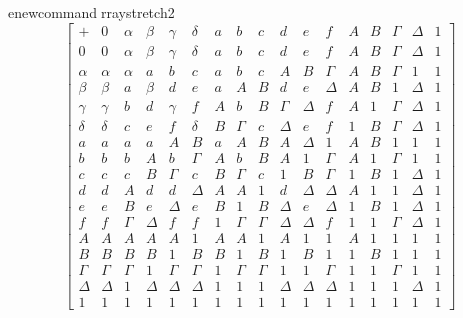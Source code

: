 enewcommand{rraystretch}{2}
  \[\begin{bmatrix}
   + & 0 & \alpha & \beta & \gamma & \delta & a & b & c & d & e & f & A & B & \Gamma & \Delta & 1 \\
  0 & 0 & \alpha & \beta & \gamma & \delta & a & b & c & d & e & f & A & B & \Gamma & \Delta & 1 \\
  \alpha & \alpha & \alpha & a & b & c & a & b & c & A & B & \Gamma & A & B & \Gamma & 1 & 1 \\
  \beta & \beta & a & \beta & d & e & a & A & B & d & e & \Delta & A & B & 1 & \Delta & 1 \\
  \gamma & \gamma & b & d & \gamma & f & A & b & B & \Gamma & \Delta & f & A & 1 & \Gamma & \Delta & 1 \\
  \delta & \delta & c & e & f & \delta & B & \Gamma & c & \Delta & e & f & 1 & B & \Gamma & \Delta & 1 \\
  a & a & a & a & A & B & a & A & B & A & \Delta & 1 & A & B & 1 & 1 & 1 \\
  b & b & b & A & b & \Gamma & A & b & B & A & 1 & \Gamma & A & 1 & \Gamma & 1 & 1 \\
  c & c & c & B & \Gamma & c & B & \Gamma & c & 1 & B & \Gamma & 1 & B & 1 & \Delta & 1 \\
  d & d & A & d & d & \Delta & A & A & 1 & d & \Delta & \Delta & A & 1 & 1 & \Delta & 1 \\
  e & e & B & e & \Delta & e & B & 1 & B & \Delta & e & \Delta & 1 & B & 1 & \Delta & 1 \\
  f & f & \Gamma & \Delta & f & f & 1 & \Gamma & \Gamma & \Delta & \Delta & f & 1 & 1 & \Gamma & \Delta & 1 \\
  A & A & A & A & A & 1 & A & A & 1 & A & 1 & 1 & A & 1 & 1 & 1 & 1 \\
  B & B & B & B & 1 & B & B & 1 & B & 1 & B & 1 & 1 & B & 1 & 1 & 1 \\
  \Gamma & \Gamma & \Gamma & 1 & \Gamma & \Gamma & 1 & \Gamma & \Gamma & 1 & 1 & \Gamma & 1 & 1 & \Gamma & 1 & 1 \\
  \Delta & \Delta & 1 & \Delta & \Delta & \Delta & 1 & 1 & 1 & \Delta & \Delta & \Delta & 1 & 1 & 1 & \Delta & 1 \\
  1 & 1 & 1 & 1 & 1 & 1 & 1 & 1 & 1 & 1 & 1 & 1 & 1 & 1 & 1 & 1 & 1
  \end{bmatrix}\]

